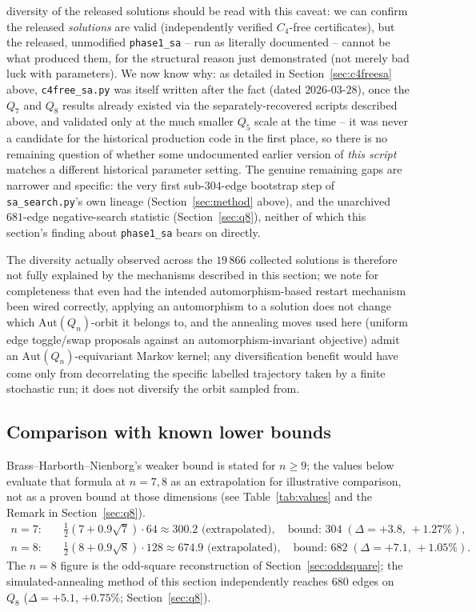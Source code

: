 \documentclass[12pt,a4paper]{article}
\theoremstyle{definition}
\begin{document}
diversity of the released solutions should be read with this caveat:
we can confirm the released \emph{solutions} are valid (independently
verified $C_4$-free certificates), but the released, unmodified
\texttt{phase1\_sa} -- run as literally
documented -- cannot be what produced them, for the structural reason
just demonstrated (not merely bad luck with parameters). We now know why: as detailed in
Section~\ref{sec:c4freesa} above, \texttt{c4free\_sa.py} was itself
written after the fact (dated $2026$-$03$-$28$), once the $Q_7$ and
$Q_8$ results already existed via the separately-recovered scripts
described above, and validated only at the much smaller $Q_5$ scale at
the time -- it was never a candidate for the historical production
code in the first place, so there is no remaining question of whether
some undocumented earlier version of \emph{this script} matches a
different historical parameter setting. The genuine remaining gaps are
narrower and specific: the very first sub-$304$-edge bootstrap step of
\texttt{sa\_search.py}'s own lineage (Section~\ref{sec:method} above),
and the unarchived $681$-edge negative-search statistic
(Section~\ref{sec:q8}), neither of which this section's finding about
\texttt{phase1\_sa} bears on directly.

The diversity actually
observed across the $19\,866$ collected solutions is therefore not
fully explained by the mechanisms described in this section; we note
for completeness that even
had the intended automorphism-based restart mechanism been wired correctly, applying an
automorphism to a solution does not change which $\mathrm{Aut}(Q_n)$-orbit
it belongs to, and the annealing moves used here (uniform edge
toggle/swap proposals against an automorphism-invariant objective) admit
an $\mathrm{Aut}(Q_n)$-equivariant Markov kernel; any diversification
benefit would have come only from decorrelating the specific labelled
trajectory taken by a finite stochastic run; it does not diversify the
orbit sampled from.

\subsection{Comparison with known lower bounds}

Brass--Harborth--Nienborg's weaker bound is stated for $n\ge9$; the
values below evaluate that formula at $n=7,8$ as an extrapolation for
illustrative comparison, not as a proven bound at those dimensions
(see Table~\ref{tab:values} and the Remark in
Section~\ref{sec:q8}).
\begin{align*}
n=7:&\quad\tfrac12(7+0.9\sqrt7)\cdot64\approx300.2\text{ (extrapolated)},\quad\text{bound: }304\;(\Delta=+3.8,\,+1.27\%),\\
n=8:&\quad\tfrac12(8+0.9\sqrt8)\cdot128\approx674.9\text{ (extrapolated)},\quad\text{bound: }682\;(\Delta=+7.1,\,+1.05\%).
\end{align*}
The $n=8$ figure is the odd-square reconstruction of
Section~\ref{sec:oddsquare}; the simulated-annealing method of this section
independently reaches 680 edges on $Q_8$ ($\Delta=+5.1$, $+0.75\%$;
Section~\ref{sec:q8}).
\end{document}
